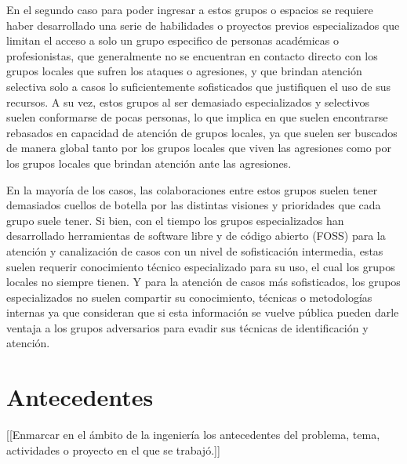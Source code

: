 \documentclass[12pt]{caltech_thesis}
\begin{document}
En el segundo caso para poder ingresar a estos grupos o espacios se requiere haber desarrollado una serie de habilidades o proyectos previos especializados que limitan el acceso a solo un grupo especifico de personas académicas o profesionistas, que generalmente no se encuentran en contacto directo con los grupos locales que sufren los ataques o agresiones, y que brindan atención selectiva solo a casos lo suficientemente sofisticados que justifiquen el uso de sus recursos. A su vez, estos grupos al ser demasiado especializados y selectivos suelen conformarse de pocas personas, lo que implica en que suelen encontrarse rebasados en capacidad de atención de grupos locales, ya que suelen ser buscados de manera global tanto por los grupos locales que viven las agresiones como por los grupos locales que brindan atención ante las agresiones.

En la mayoría de los casos, las colaboraciones entre estos grupos suelen tener demasiados cuellos de botella  por las distintas visiones y prioridades que cada grupo suele tener. Si bien, con el tiempo los grupos especializados han desarrollado herramientas de software libre  y de código abierto  (FOSS)  para la atención y canalización de casos con un nivel de sofisticación intermedia, estas suelen requerir conocimiento técnico especializado para su uso, el cual los grupos locales no siempre tienen. Y para la atención de casos más sofisticados, los grupos especializados no suelen compartir su conocimiento, técnicas o metodologías internas ya que consideran que si esta información se vuelve pública pueden darle ventaja a los grupos adversarios para evadir sus técnicas de identificación y atención.


\chapter{Antecedentes}

[[Enmarcar en el ámbito de la ingeniería los antecedentes del problema, tema, actividades o proyecto en el que se trabajó.]]
\end{document}
